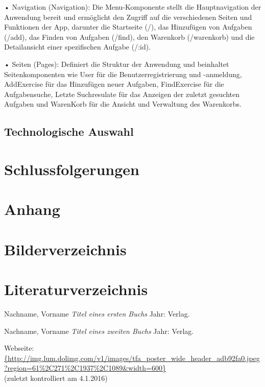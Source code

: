 \documentclass[12pt,a4paper]{article} %
\begin{document}
•	Navigation (Navigation): Die Menu-Komponente stellt die Hauptnavigation der Anwendung bereit und ermöglicht den Zugriff auf die verschiedenen Seiten und Funktionen der App, darunter die Startseite (/), das Hinzufügen von Aufgaben (/add), das Finden von Aufgaben (/find), den Warenkorb (/warenkorb) und die Detailansicht einer spezifischen Aufgabe (/:id).

•	Seiten (Pages): Definiert die Struktur der Anwendung und beinhaltet Seitenkomponenten wie User für die Benutzerregistrierung und -anmeldung, AddExercise für das Hinzufügen neuer Aufgaben, FindExercise für die Aufgabensuche, Letzte Suchresulate für das Anzeigen der zuletzt gesuchten Aufgaben und WarenKorb für die Ansicht und Verwaltung des Warenkorbs.

\newpage


\subsection{Technologische Auswahl}


\section{Schlussfolgerungen}
\newpage




\appendix
\section{Anhang}
\newpage





\section{Bilderverzeichnis}
\listoffigures



\newpage
\section{Literaturverzeichnis}

\begin{thebibliography}{1} %


 Nachname, Vorname {\em Titel eines ersten Buchs} Jahr: Verlag.

 Nachname, Vorname {\em Titel eines zweiten Buchs} Jahr: Verlag.

 Webseite: \url{{http://img.lum.dolimg.com/v1/images/tfa_poster_wide_header_adb92fa0.jpeg?region=61%
\\(zuletzt kontrolliert am 4.1.2016)


\end{thebibliography}
\end{document}
